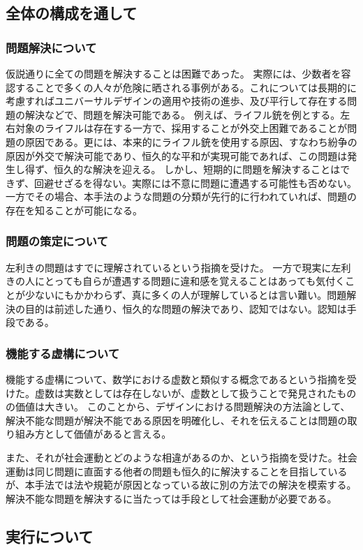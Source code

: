 \documentclass{jsarticle}
\begin{document}
\subsection{全体の構成を通して}
\subsubsection{問題解決について}
仮説通りに全ての問題を解決することは困難であった。
実際には、少数者を容認することで多くの人々が危険に晒される事例がある。これについては長期的に考慮すればユニバーサルデザインの適用や技術の進歩、及び平行して存在する問題の解決などで、問題を解決可能である。
例えば、ライフル銃を例とする。左右対象のライフルは存在する一方で、採用することが外交上困難であることが問題の原因である。更には、本来的にライフル銃を使用する原因、すなわち紛争の原因が外交で解決可能であり、恒久的な平和が実現可能であれば、この問題は発生し得ず、恒久的な解決を迎える。
しかし、短期的に問題を解決することはできず、回避せざるを得ない。実際には不意に問題に遭遇する可能性も否めない。
一方でその場合、本手法のような問題の分類が先行的に行われていれば、問題の存在を知ることが可能になる。

\subsubsection{問題の策定について}
左利きの問題はすでに理解されているという指摘を受けた。
一方で現実に左利きの人にとっても自らが遭遇する問題に違和感を覚えることはあっても気付くことが少ないにもかかわらず、真に多くの人が理解しているとは言い難い。問題解決の目的は前述した通り、恒久的な問題の解決であり、認知ではない。認知は手段である。


\subsubsection{機能する虚構について}
機能する虚構について、数学における虚数と類似する概念であるという指摘を受けた。虚数は実数としては存在しないが、虚数として扱うことで発見されたものの価値は大きい。
このことから、デザインにおける問題解決の方法論として、解決不能な問題が解決不能である原因を明確化し、それを伝えることは問題の取り組み方として価値があると言える。

また、それが社会運動とどのような相違があるのか、という指摘を受けた。社会運動は同じ問題に直面する他者の問題も恒久的に解決することを目指しているが、本手法では法や規範が原因となっている故に別の方法での解決を模索する。解決不能な問題を解決するに当たっては手段として社会運動が必要である。


\subsection{実行について}
\end{document}
